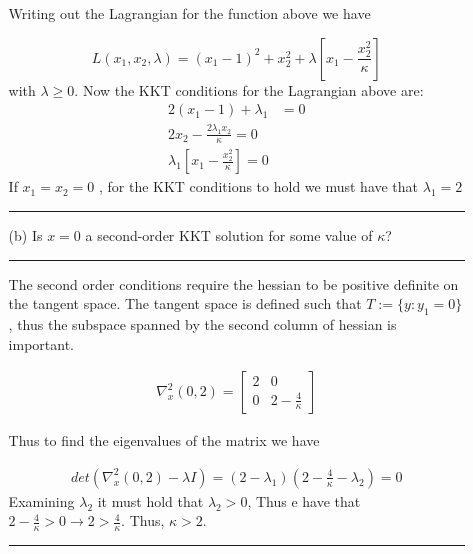\documentclass{article} %
\begin{document}
\begin{enumerate}
\begin{itemize}
Writing out the Lagrangian for the function above we have 

\[
L(x_1, x_2, \lambda) = (x_1 - 1)^2 + x_2^2 + \lambda [ x_1 - \frac{x_2^2}{\kappa}]
\]
with $\lambda \geq 0$. 
Now the KKT conditions for the Lagrangian above are:
\begin{equation*}
\begin{aligned}
2(x_1 - 1) + \lambda_1 &= 0 \\ 
2 x_2 - \frac{2\lambda_1 x_2}{\kappa} = 0 \\ 
\lambda_1 [ x_1 - \frac{x_2^2}{\kappa}] = 0 
\end{aligned}
\end{equation*}
If $x_1 = x_2 = 0$ , for the KKT conditions to hold we must have that $\lambda_1 = 2$ 



 \rule{\textwidth}{1pt}


\item[(b)] Is $x=0$ a second-order KKT solution for some value of $\kappa$?

\rule{\textwidth}{1pt}

The second order conditions require the hessian to be positive definite on the tangent space. The tangent space is defined such that $T := \{y: y_1 = 0\}$, thus
the subspace spanned by the second column of hessian is important. 


\begin{equation*}
\begin{aligned}
\nabla_x^2(0,2) = \begin{bmatrix} 2 & 0 \\ 0 & 2 - \frac{4}{\kappa} \end{bmatrix} 
\end{aligned}
\end{equation*}

Thus to find the eigenvalues of the matrix we have 

\begin{equation*}
\begin{aligned}
det(\nabla_x^2(0,2) - \lambda I) = (2 - \lambda_1)( 2 - \frac{4}{\kappa} - \lambda_2) = 0
\end{aligned}
\end{equation*}
Examining $ \lambda_2$ it must hold that $\lambda_2 > 0$, Thus e have that $ 2 - \frac{4}{\kappa} > 0 \rightarrow 2 > \frac{4}{\kappa}$. Thus, $\kappa > 2$. 


\rule{\textwidth}{1pt}

\end{itemize}


\end{enumerate}
\end{document}
